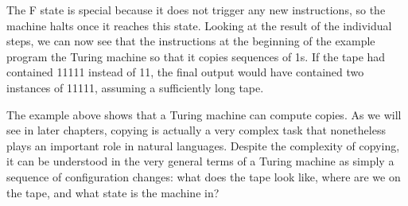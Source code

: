 \begin{examplebox}
\begin{center}

    \end{center}
    
    The F state is special because it does not trigger any new instructions, so the machine halts once it reaches this state.
    Looking at the result of the individual steps, we can now see that the instructions at the beginning of the example program the Turing machine so that it copies sequences of 1s.
    If the tape had contained 11111 instead of 11, the final output would have contained two instances of 11111, assuming a sufficiently long tape.
\end{examplebox}

The example above shows that a Turing machine can compute copies.
As we will see in later chapters, copying is actually a very complex task that nonetheless plays an important role in natural languages.
Despite the complexity of copying, it can be understood in the very general terms of a Turing machine as simply a sequence of configuration changes: what does the tape look like, where are we on the tape, and what state is the machine in?

